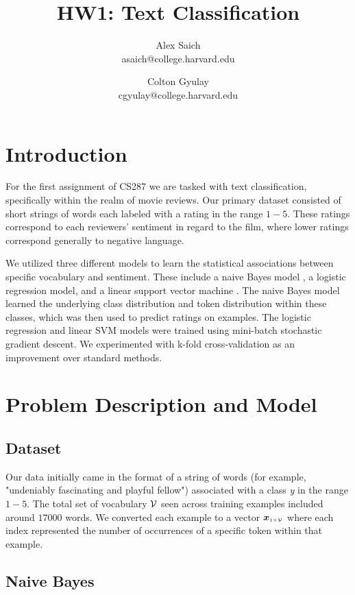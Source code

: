 \documentclass[11pt]{article}
\title{HW1: Text Classification}
\author{Alex Saich \\ asaich@college.harvard.edu \and Colton Gyulay \\ cgyulay@college.harvard.edu }
\begin{document}
\maketitle{}
\section{Introduction}

For the first assignment of CS287 we are tasked with text classification, specifically within the realm of movie reviews. Our primary dataset consisted of short strings of words each labeled with a rating in the range $1- 5$. These ratings correspond to each reviewers' sentiment in regard to the film, where lower ratings correspond generally to negative language.

We utilized three different models to learn the statistical associations between specific vocabulary and sentiment. These include a naive Bayes model \citep{murphy2012machine}, a logistic regression model, and a linear support vector machine \citep{wang2012baselines}. The naive Bayes model learned the underlying class distribution and token distribution within these classes, which was then used to predict ratings on examples. The logistic regression and linear SVM models were trained using mini-batch stochastic gradient descent. We experimented with k-fold cross-validation as an improvement over standard methods.

\section{Problem Description and Model}

\subsection{Dataset}

Our data initially came in the format of a string of words (for example, "undeniably fascinating and playful fellow") associated with a class \textit{y} in the range $1- 5$. The total set of vocabulary $\mathcal{V}$ seen across training examples included around $17000$ words. We converted each example to a vector $\boldsymbol{x}_{\scriptscriptstyle 1\times \mathcal{V}}$ where each index represented the number of occurrences of a specific token within that example.

\subsection{Naive Bayes}
\end{document}
